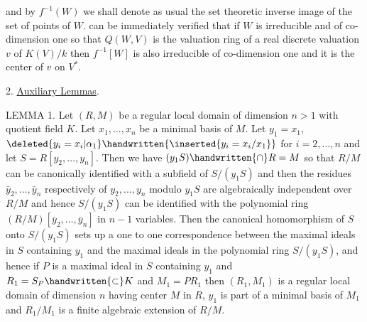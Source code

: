 and by $f^{-1}(W)$ we shall denote as usual the set theoretic inverse image of the set of points of $W$.  can be immediately verified that if $W$ is irreducible and of co-dimension one so that $Q(W,V)$ is the valuation ring of a real discrete valuation $v$ of $K(V)/k$ then $f^{-1}[W]$ is also irreducible of co-dimension one and it is the center of $v$ on $V^*$.

2. \uline{Auxiliary Lemmas}.

LEMMA 1. Let $(R,M)$ be a regular local domain of dimension $n>1$ with quotient field $K$. Let $x_1,\ldots,x_n$ be a minimal basis of $M$. Let $y_1=x_1$, $\deleted{y_i=x_i\vert\alpha_1}\handwritten{\inserted{y_i=x_i/x_1}}$ for $i=2,\ldots,n$ and let $S=R[y_2,\ldots,y_n]$. Then we have $(y_1S)\handwritten{\cap}R=M$ so that $R/M$ can be canonically identified with a subfield of $S/(y_1S)$ and then the residues $\bar y_2,\ldots,\bar y_n$ respectively of $y_2,\ldots,y_n$ modulo $y_1S$ are algebraically independent over $R/M$ and hence $S/(y_1S)$ can be identified with the polynomial ring $(R/M)[\bar y_2,\ldots,\bar y_n]$ in $n-1$ variables. Then the canonical homomorphism of $S$ onto $S/(y_1S)$ sets up a one to one correspondence between the maximal ideals in $S$ containing $y_1$ and the maximal ideals in the polynomial ring $S/(y_1S)$, and hence if $P$ is a maximal ideal in $S$ containing $y_1$ and $R_1=S_P\handwritten{\subset} K$ and $M_1=PR_1$ then $(R_1,M_1)$ is a regular local domain of dimension $n$ having center $M$ in $R$, $y_1$ is part of a minimal basis of $M_1$ and $R_1/M_1$ is a finite algebraic extension of $R/M$.
